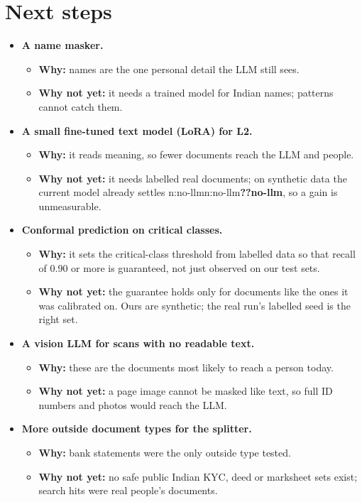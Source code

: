 \documentclass[9pt]{extarticle}
\newcommand\N[1]{\ifcsname n:#1\endcsname\csname n:#1\endcsname\else\textbf{??#1}\fi}
\newcommand\lab[1]{\textcolor{norange}{\textbf{#1}}}
\begin{document}
\section{Next steps}
\begin{itemize}
\item \textbf{A name masker.}
  \begin{itemize}
  \item \lab{Why:} names are the one personal detail the LLM still sees.
  \item \lab{Why not yet:} it needs a trained model for Indian names; patterns cannot catch them.
  \end{itemize}
\item \textbf{A small fine-tuned text model (LoRA) for L2.}
  \begin{itemize}
  \item \lab{Why:} it reads meaning, so fewer documents reach the LLM and people.
  \item \lab{Why not yet:} it needs labelled real documents; on synthetic data the current model already settles \N{no-llm}, so a gain is unmeasurable.
  \end{itemize}
\item \textbf{Conformal prediction on critical classes.}
  \begin{itemize}
  \item \lab{Why:} it sets the critical-class threshold from labelled data so that recall of 0.90 or more is guaranteed, not just observed on our test sets.
  \item \lab{Why not yet:} the guarantee holds only for documents like the ones it was calibrated on. Ours are synthetic; the real run's labelled seed is the right set.
  \end{itemize}
\item \textbf{A vision LLM for scans with no readable text.}
  \begin{itemize}
  \item \lab{Why:} these are the documents most likely to reach a person today.
  \item \lab{Why not yet:} a page image cannot be masked like text, so full ID numbers and photos would reach the LLM.
  \end{itemize}
\item \textbf{More outside document types for the splitter.}
  \begin{itemize}
  \item \lab{Why:} bank statements were the only outside type tested.
  \item \lab{Why not yet:} no safe public Indian KYC, deed or marksheet sets exist; search hits were real people's documents.
  \end{itemize}
\end{itemize}
\end{document}
